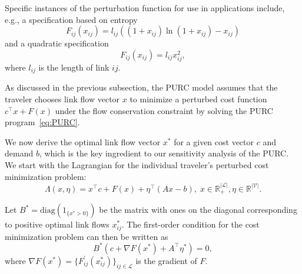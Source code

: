 \documentclass[a4paper,11pt]{article}
\newcommand{\R}{\mathbb{R}}
\begin{document}
Specific instances of the perturbation function for use in applications include, e.g., a specification based on entropy 
\begin{equation}
F_{ij}\left( x_{ij}\right) = l_{ij} (\left( 1+x_{ij}\right) \ln \left( 1+x_{ij}\right)
-x_{ij})  \label{eq:Fentropic}
\end{equation}%
and a quadratic specification 
\begin{equation}\label{eq:Fquad}
F_{ij}\left( x_{ij}\right) =l_{ij} x_{ij}^{2},
\end{equation}
where $l_{ij}$ is the length of link $ij$. 


As discussed in the previous subsection, the PURC model assumes that the traveler chooses link flow vector $x$ to minimize a perturbed cost function $c^{\top }x+F(x)$ under the flow conservation constraint by solving the PURC program~\eqref{eq:PURC}. 


We now derive the optimal link flow vector  $x^*$ for a given cost vector $c$ and demand $b$, which is the key ingredient to our sensitivity analysis of the PURC. We start with the Lagrangian for the individual traveler's perturbed cost minimization problem: 
\begin{equation}  \label{eq_Lagrange}
\Lambda( x,\eta) =x ^\top c + F(x) +\eta ^\top \left( Ax-b\right) ,\; x\in 
\mathbb{R}_+^{|\mathcal{L}|}, \eta\in \R^{|\mathcal{V}|}.
\end{equation}

Let $B^* = \mathrm{diag} \left( 1_{\{x^*>0\}} \right)$ be the matrix with ones on the diagonal corresponding to positive optimal link flows $x^*_{ij}$. The first-order condition for the cost minimization problem can then be written as
\begin{equation}
{B^*}\left( c+\nabla F\left( x^*\right) +A^{\top }{\eta^*}\right) =0,
\label{eq:1}
\end{equation}%
where $\nabla F(x^*) = \{F_{ij}^{\prime
}(x^*_{ij})\}_{ij\in \mathcal{L}}$ is the gradient of $F$.
\end{document}
